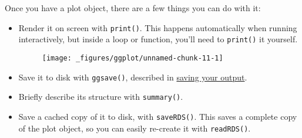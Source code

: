 Once you have a plot object, there are a few things you can do with it:

\begin{itemize}
\item
  Render it on screen with \texttt{print()}. This happens automatically
  when running interactively, but inside a loop or function, you'll need
  to \texttt{print()} it yourself. 

\begin{Shaded}
\begin{Highlighting}[]
\end{Highlighting}
\end{Shaded}

  \begin{figure}[H]
    \centering
    \texttt{[image: \_figures/ggplot/unnamed-chunk-11-1]}
  \end{figure}
\item
  Save it to disk with \texttt{ggsave()}, described in
  \protect\hyperlink{sec:saving}{saving your output}.

\begin{Shaded}
\begin{Highlighting}[]
\NormalTok{(}\NormalTok{, } \NormalTok{, } \NormalTok{)}
\end{Highlighting}
\end{Shaded}
\item
  Briefly describe its structure with \texttt{summary()}.

\begin{Shaded}
\begin{Highlighting}[]
\CommentTok{#> -----------------------------------}
\end{Highlighting}
\end{Shaded}
\item
  Save a cached copy of it to disk, with \texttt{saveRDS()}. This saves
  a complete copy of the plot object, so you can easily re-create it
  with \texttt{readRDS()}.  

\begin{Shaded}
\begin{Highlighting}[]
\NormalTok{)}
\StringTok{ }\NormalTok{(}\NormalTok{)}
\end{Highlighting}
\end{Shaded}
\end{itemize}

